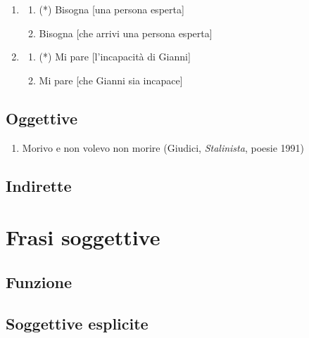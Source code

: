 \documentclass[
  a4paper,
  twoside,
  11pt,
  chapterprefix=false,
  bibliography=totocnumbered,
  listof=flat]{scrbook}
\providecommand{\tightlist}{%
  \setlength{\itemsep}{0pt}\setlength{\parskip}{0pt}}
\begin{document}
\begin{enumerate}
\def\labelenumi{(\arabic{enumi})}
\setcounter{enumi}{48}
\item
  \begin{enumerate}
  \def\labelenumii{\alph{enumii}.}
  \tightlist
  \item
    (*) Bisogna {[}una persona esperta{]}
  \item
    Bisogna {[}che arrivi una persona esperta{]}
  \end{enumerate}
\item
  \begin{enumerate}
  \def\labelenumii{\alph{enumii}.}
  \tightlist
  \item
    (*) Mi pare {[}l'incapacità di Gianni{]}
  \item
    Mi pare {[}che Gianni sia incapace{]}
  \end{enumerate}
\end{enumerate}

\hypertarget{oggettive}{%
\section{Oggettive}\label{oggettive}}

\begin{enumerate}
\def\labelenumi{(\arabic{enumi})}
\setcounter{enumi}{50}
\tightlist
\item
  Morivo e non volevo non morire (Giudici, \emph{Stalinista}, poesie 1991)
\end{enumerate}

\hypertarget{indirette}{%
\section{Indirette}\label{indirette}}

\hypertarget{frasi-soggettive}{%
\chapter{Frasi soggettive}\label{frasi-soggettive}}

\hypertarget{funzione}{%
\section{Funzione}\label{funzione}}

\hypertarget{soggettive-esplicite}{%
\section{Soggettive esplicite}\label{soggettive-esplicite}}
\end{document}
